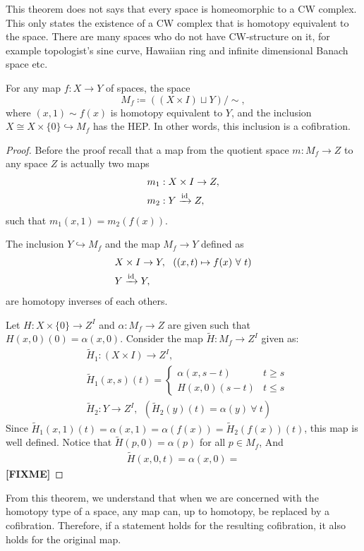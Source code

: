 \begin{remark}
	This theorem does not says that every space is homeomorphic to a CW complex.
	This only states the existence of a CW complex that is homotopy equivalent to the space.
	There are many spaces who do not have CW-structure on it, for example topologist's sine curve, Hawaiian ring and infinite dimensional Banach space etc.
\end{remark}

\begin{theorem}
	For any map \(f: X \to Y\) of spaces, the space
	\[M_f \coloneq ((X \times I) \sqcup Y)/\sim,\]
	where \((x,1) \sim f(x)\) is homotopy equivalent to \(Y\), and the inclusion \(X \cong X \times \{0\} \hookrightarrow M_f\) has the HEP.
	In other words, this inclusion is a cofibration.
\end{theorem}
\begin{proof}
	Before the proof recall that a map from the quotient space \(m: M_f \to Z\) to any space \(Z\) is actually two maps
	\begin{align*}
		&m_1:X \times I \to Z,\\
		&m_2: Y \xrightarrow{\operatorname{id}} Z, 
	\end{align*}
	such that \(m_1(x,1) = m_2(f(x))\).
	
	The inclusion \(Y \hookrightarrow M_f\) and the map \(M_f \to Y\) defined as
	\begin{align*}
		&X \times I \to Y,\ \ ((x,t) \mapsto f(x)\ \forall\ t)\\
		&Y \xrightarrow{\operatorname{id}} Y, 
	\end{align*}
	are homotopy inverses of each others.
	
	Let \(H: X \times \{0\} \to Z^I\) and \(\alpha: M_f \to Z\) are given such that \(H(x,0)(0)= \alpha(x,0)\).
	Consider the map \(\tilde H : M_f \to Z^I\) given as:
	\begin{align*}
		&\tilde H_1 : (X \times I) \to Z^I,\\
		&\tilde H_1(x,s)(t) =\begin{cases}
		 	\alpha(x,s-t)	 & t \geq s\\
		 	H(x,0)(s-t) & t\leq s
		 \end{cases} \\
		&\tilde H_2 : Y \to Z^I, \ \ (\tilde H_2(y)(t) = \alpha(y)\ \forall \ t)
	\end{align*}
	Since \(\tilde H_1(x,1)(t) = \alpha(x,1) =  \alpha(f(x))  = \tilde H_2(f(x))(t)\), this map is well defined.
	Notice that \(\tilde H(p, 0) = \alpha(p)\) for all \(p \in M_f\),
	And
	\begin{align*}
		\tilde H(x,0,t) = \alpha(x,0) = 
	\end{align*}
	\textbf{[FIXME]}
\end{proof}
From this theorem, we understand that when we are concerned with the homotopy type of a space, any map can, up to homotopy, be replaced by a cofibration. Therefore, if a statement holds for the resulting cofibration, it also holds for the original map.

